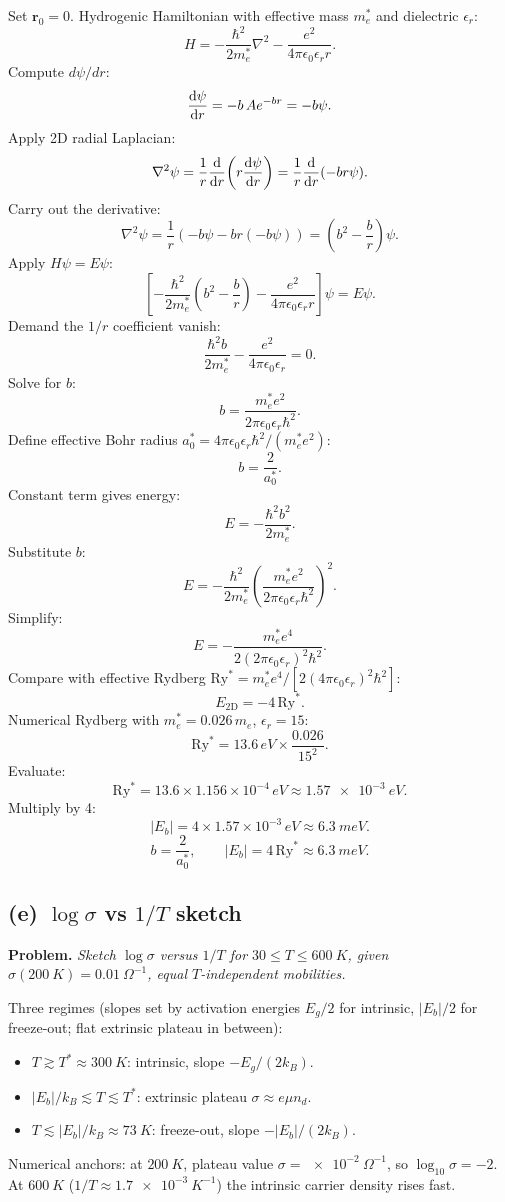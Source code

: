 \documentclass[11pt]{article}
\newcommand{\Lap}{\nabla^{2}}
\begin{document}
Set $\bm r_0=0$. Hydrogenic Hamiltonian with effective mass $m_e^*$ and dielectric $\epsilon_r$:
\[
H = -\frac{\hbar^2}{2m_e^*}\Lap - \frac{e^2}{4\pi\epsilon_0\epsilon_r r}.
\]
Compute $d\psi/dr$:
\[
\dv{\psi}{r} = -b\, A e^{-br} = -b\psi.
\]
Apply 2D radial Laplacian:
\[
\Lap\psi = \frac{1}{r}\dv{r}\!\left(r\dv{\psi}{r}\right) = \frac{1}{r}\dv{r}(-b r\psi).
\]
Carry out the derivative:
\[
\Lap\psi = \frac{1}{r}(-b\psi - b r (-b\psi)) = \left(b^2 - \frac{b}{r}\right)\psi.
\]
Apply $H\psi = E\psi$:
\[
\left[-\frac{\hbar^2}{2m_e^*}\!\left(b^2-\frac{b}{r}\right) - \frac{e^2}{4\pi\epsilon_0\epsilon_r r}\right]\psi = E\psi.
\]
Demand the $1/r$ coefficient vanish:
\[
\frac{\hbar^2 b}{2m_e^*} - \frac{e^2}{4\pi\epsilon_0\epsilon_r} = 0.
\]
Solve for $b$:
\[
b = \frac{m_e^* e^2}{2\pi\epsilon_0\epsilon_r\hbar^2}.
\]
Define effective Bohr radius $a_0^* = 4\pi\epsilon_0\epsilon_r\hbar^2/(m_e^* e^2)$:
\[
b = \frac{2}{a_0^*}.
\]
Constant term gives energy:
\[
E = -\frac{\hbar^2 b^2}{2m_e^*}.
\]
Substitute $b$:
\[
E = -\frac{\hbar^2}{2m_e^*}\!\left(\frac{m_e^* e^2}{2\pi\epsilon_0\epsilon_r\hbar^2}\right)^{\!2}.
\]
Simplify:
\[
E = -\frac{m_e^* e^4}{2(2\pi\epsilon_0\epsilon_r)^2\hbar^2}.
\]
Compare with effective Rydberg $\mathrm{Ry}^* = m_e^* e^4/[2(4\pi\epsilon_0\epsilon_r)^2\hbar^2]$:
\[
E_{\text{2D}} = -4\,\mathrm{Ry}^*.
\]
Numerical Rydberg with $m_e^*=0.026\,m_e$, $\epsilon_r=15$:
\[
\mathrm{Ry}^* = 13.6\,\si{eV}\times \frac{0.026}{15^2}.
\]
Evaluate:
\[
\mathrm{Ry}^* = 13.6\times 1.156\times 10^{-4}\,\si{eV} \approx \SI{1.57e-3}{eV}.
\]
Multiply by 4:
\[
|E_b| = 4\times 1.57\times 10^{-3}\,\si{eV} \approx \SI{6.3}{meV}.
\]
\[
\boxed{\;b = \frac{2}{a_0^*}, \qquad |E_b| = 4\,\mathrm{Ry}^* \approx \SI{6.3}{meV}.\;}
\]

\subsection*{(e) $\log\sigma$ vs $1/T$ sketch}

\textbf{Problem.} \emph{Sketch $\log\sigma$ versus $1/T$ for $30\le T\le \SI{600}{K}$, given $\sigma(\SI{200}{K})=\SI{0.01}{\Omega^{-1}}$, equal $T$-independent mobilities.}

Three regimes (slopes set by activation energies $E_g/2$ for intrinsic, $|E_b|/2$ for freeze-out; flat extrinsic plateau in between):
\begin{itemize}
\item $T\gtrsim T^*\approx \SI{300}{K}$: intrinsic, slope $-E_g/(2k_B)$.
\item $|E_b|/k_B \lesssim T \lesssim T^*$: extrinsic plateau $\sigma \approx e\mu n_d$.
\item $T \lesssim |E_b|/k_B\approx \SI{73}{K}$: freeze-out, slope $-|E_b|/(2k_B)$.
\end{itemize}
Numerical anchors: at $\SI{200}{K}$, plateau value $\sigma=\SI{e-2}{\Omega^{-1}}$, so $\log_{10}\sigma=-2$. At $\SI{600}{K}$ ($1/T\approx \SI{1.7e-3}{K^{-1}}$) the intrinsic carrier density rises fast.
\end{document}
